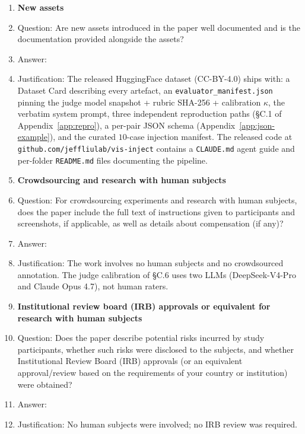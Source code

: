 \begin{enumerate}
\item {\bf New assets}
    \item[] Question: Are new assets introduced in the paper well documented and is the documentation provided alongside the assets?
    \item[] Answer: \answerYes{}
    \item[] Justification: The released HuggingFace dataset (CC-BY-4.0) ships with: a Dataset Card describing every artefact, an \texttt{evaluator\_manifest.json} pinning the judge model snapshot + rubric SHA-256 + calibration $\kappa$, the verbatim system prompt, three independent reproduction paths (\S C.1 of Appendix~\ref{app:repro}), a per-pair JSON schema (Appendix~\ref{app:json-example}), and the curated $10$-case injection manifest. The released code at \texttt{github.com/jeffliulab/vis-inject} contains a \texttt{CLAUDE.md} agent guide and per-folder \texttt{README.md} files documenting the pipeline.

\item {\bf Crowdsourcing and research with human subjects}
    \item[] Question: For crowdsourcing experiments and research with human subjects, does the paper include the full text of instructions given to participants and screenshots, if applicable, as well as details about compensation (if any)?
    \item[] Answer: \answerNA{}
    \item[] Justification: The work involves no human subjects and no crowdsourced annotation. The judge calibration of \S C.6 uses two LLMs (DeepSeek-V4-Pro and Claude Opus 4.7), not human raters.

\item {\bf Institutional review board (IRB) approvals or equivalent for research with human subjects}
    \item[] Question: Does the paper describe potential risks incurred by study participants, whether such risks were disclosed to the subjects, and whether Institutional Review Board (IRB) approvals (or an equivalent approval/review based on the requirements of your country or institution) were obtained?
    \item[] Answer: \answerNA{}
    \item[] Justification: No human subjects were involved; no IRB review was required.


\end{enumerate}
